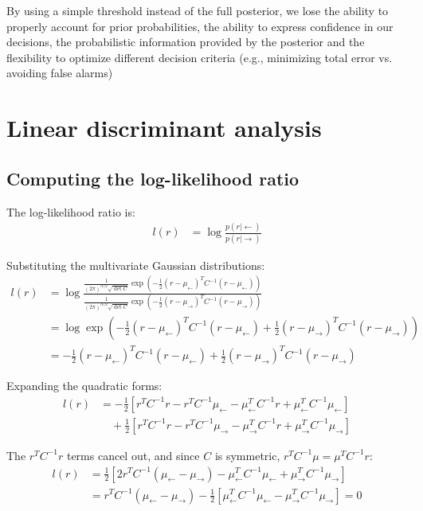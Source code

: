 \documentclass{article}
\begin{document}
By using a simple threshold instead of the full posterior, we lose the ability to properly account for prior probabilities, the ability to express confidence in our decisions, the  probabilistic information provided by the posterior and the flexibility to optimize different decision criteria (e.g., minimizing total error vs. avoiding false alarms)

\section{Linear discriminant analysis}

\subsection{Computing the log-likelihood ratio}
The log-likelihood ratio is:
\begin{align}
l(r) &= \log\frac{p(r|\leftarrow)}{p(r|\rightarrow)}
\end{align}

Substituting the multivariate Gaussian distributions:
\begin{align}
l(r) &= \log\frac{\frac{1}{(2\pi)^{N/2}\sqrt{\det C}} \exp\left(-\frac{1}{2}(r - \mu_\leftarrow)^T C^{-1} (r - \mu_\leftarrow)\right)}{\frac{1}{(2\pi)^{N/2}\sqrt{\det C}} \exp\left(-\frac{1}{2}(r - \mu_\rightarrow)^T C^{-1} (r - \mu_\rightarrow)\right)} \\
&= \log\exp\left(-\frac{1}{2}(r - \mu_\leftarrow)^T C^{-1} (r - \mu_\leftarrow) + \frac{1}{2}(r - \mu_\rightarrow)^T C^{-1} (r - \mu_\rightarrow)\right) \\
&= -\frac{1}{2}(r - \mu_\leftarrow)^T C^{-1} (r - \mu_\leftarrow) + \frac{1}{2}(r - \mu_\rightarrow)^T C^{-1} (r - \mu_\rightarrow)
\end{align}

Expanding the quadratic forms:
\begin{align}
l(r) &= -\frac{1}{2}\left[r^T C^{-1} r - r^T C^{-1} \mu_\leftarrow - \mu_\leftarrow^T C^{-1} r + \mu_\leftarrow^T C^{-1} \mu_\leftarrow\right] \\
&\quad + \frac{1}{2}\left[r^T C^{-1} r - r^T C^{-1} \mu_\rightarrow - \mu_\rightarrow^T C^{-1} r + \mu_\rightarrow^T C^{-1} \mu_\rightarrow\right]
\end{align}

The $r^T C^{-1} r$ terms cancel out, and since $C$ is symmetric, $r^T C^{-1} \mu = \mu^T C^{-1} r$:
\begin{align}
l(r) &= \frac{1}{2}\left[2r^T C^{-1} (\mu_\leftarrow - \mu_\rightarrow) - \mu_\leftarrow^T C^{-1} \mu_\leftarrow + \mu_\rightarrow^T C^{-1} \mu_\rightarrow\right] \\
&= r^T C^{-1} (\mu_\leftarrow - \mu_\rightarrow) - \frac{1}{2}\left[\mu_\leftarrow^T C^{-1} \mu_\leftarrow - \mu_\rightarrow^T C^{-1} \mu_\rightarrow\right] = 0
\end{align}
\end{document}
